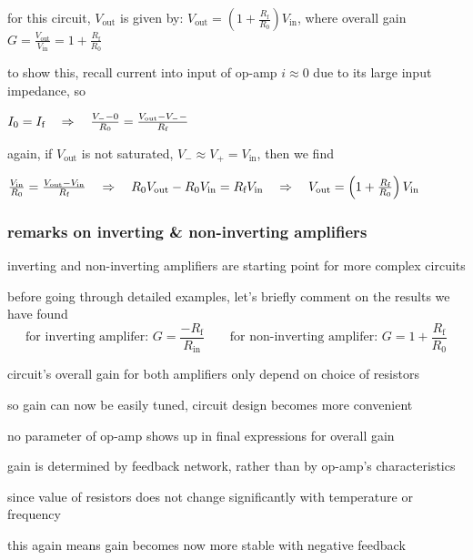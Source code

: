 for this circuit, $V_\text{out}$ is given by: $\boxed{V_\text{out} = \left(1 + \frac{R_\text{f}}{R_0}\right)V_\text{in}}$, where overall gain $G=\frac{V_\text{out}}{V_\text{in}} = 1 + \frac{R_\text{f}}{R_0}$

to show this, recall current into input of op-amp $i\approx0$ due to its large input impedance, so

{

\centering
	
$I_\text{0} = I_\text{f} \quad \Rightarrow \quad \frac{V_- - 0}{R_0} = \frac{V_\text{out} - V_- -}{R_\text{f}}$

}


again, if $V_\text{out}$ is not saturated, $V_- \approx V_+ = V_\text{in}$, then we find


{
	
\centering

$\frac{V_\text{in}}{R_0} = \frac{V_\text{out} - V_\text{in}}{R_\text{f}} \quad \Rightarrow \quad  R_0 V_\text{out} - R_0 V_\text{in} = R_\text{f} V_\text{in}
\quad \Rightarrow \quad  V_\text{out} = \left(1 + \frac{R_\text{f}}{R_0}\right)V_\text{in}$
	
}

\subsubsection*{remarks on inverting \& non-inverting amplifiers}

inverting and non-inverting amplifiers are starting point for more complex circuits

before going through detailed examples, let's briefly comment on the results we have found
\begin{equation*}
	\text{for inverting amplifer: } G=\frac{-R_\text{f}}{R_\text{in}} \qquad \text{for non-inverting amplifer: } G=1+\frac{R_\text{f}}{R_0}
\end{equation*}

\cmt circuit's overall gain for both amplifiers only depend on choice of resistors

so gain can now be easily tuned, circuit design becomes more convenient

\cmt no parameter of op-amp shows up in final expressions for overall gain

gain is determined by feedback network, rather than by op-amp's characteristics
	
since value of resistors does not change significantly with temperature or frequency

this again means gain becomes now more stable with negative feedback
	

